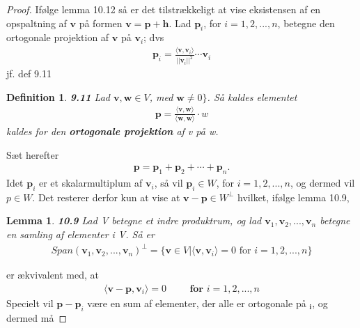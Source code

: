 \documentclass[paper=a4, fontsize=11pt]{scrartcl} %
\newtheorem*{lemma}{Lemma}
\newtheorem*{definition}{Definition}
\newenvironment{cstmlemma}[1]{\begin{lemma} {\normalfont\textbf{#1}}}{\end{lemma}}
\newenvironment{cstmdefinition}[1]{\begin{definition} {\normalfont\textbf{#1}}}{\end{definition}}
\begin{document}
	\begin{proof}
		Ifølge lemma 10.12 så er det tilstrækkeligt at vise eksistensen af en opspaltning af $\mathbf{v}$ på formen $\mathbf{v}=\mathbf{p}+\mathbf{h}$. Lad $\mathbf{p}_i$, for $i=1,2,...,n$, betegne den ortogonale projektion af $\mathbf{v}$ på $\mathbf{v}_i$; dvs
		\begin{align*}
			\mathbf{p}_i=\frac{\langle\mathbf{v},\mathbf{v}_i\rangle}{||\mathbf{v}_i||^2}\cdots\mathbf{v}_i
		\end{align*}
		jf. def 9.11
		\begin{displayquote}
			\begin{cstmdefinition}{9.11}
				Lad $\mathbf{v},\mathbf{w}\in V$, med $\mathbf{w}\neq 0\}$. Så kaldes elementet
				\begin{align*}
					\mathbf{p}=\frac{\langle\mathbf{v},\mathbf{w}\rangle}{\langle\mathbf{w},\mathbf{w}\rangle}\cdot w
				\end{align*}
				kaldes for den \textbf{ortogonale projektion} af v på w. 
			\end{cstmdefinition}
		\end{displayquote}
		Sæt herefter 
		\begin{align*}
			\mathbf{p}=\mathbf{p}_1+\mathbf{p}_2+\cdots+\mathbf{p}_n.
		\end{align*}
		Idet $\mathbf{p}_i$ er et skalarmultiplum af $\mathbf{v}_i$, så vil $\mathbf{p}_i\in W$, for $i=1,2,...,n$, og dermed vil $p\in W$. Det resterer derfor kun at vise at $\mathbf{v}-\mathbf{p}\in W^\bot$ hvilket, ifølge lemma 10.9,
		\begin{displayquote}
			\begin{cstmlemma}{10.9}
				Lad V betegne et indre produktrum, og lad $\mathbf{v}_1, \mathbf{v}_2,...,\mathbf{v}_n$ betegne en samling af elementer i V. Så er 
				\begin{align*}
					Span(\mathbf{v}_1,\mathbf{v}_2,...,\mathbf{v}_n)^\bot=\{\mathbf{v}\in V|\langle\mathbf{v},\mathbf{v}_i\rangle = 0 \text{ for } i=1,2,...,n\}
				\end{align*}
			\end{cstmlemma}
		\end{displayquote}
		er ækvivalent med, at
		\begin{align*}
			\langle\mathbf{v}-\mathbf{p},\mathbf{v}_i\rangle=0 \hspace{1cm} \textbf{for } i=1,2,...,n
		\end{align*}
		Specielt vil $\mathbf{p}-\mathbf{p}_i$ være en sum af elementer, der alle er ortogonale på $\mathbf{_i}$, og dermed må 

\end{proof}
\end{document}
